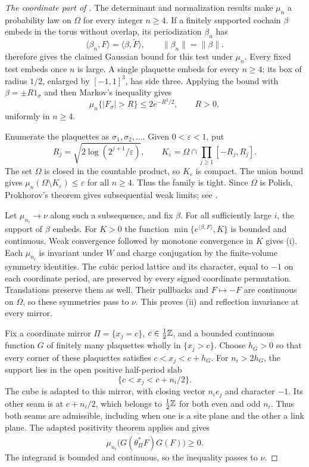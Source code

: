 \begin{proof}[The coordinate part of ]
The determinant and normalization results make $\mu_n$ a probability
law on $\Omega$ for every integer $n\ge4$. If a finitely supported
cochain $\beta$ embeds in the torus without overlap, its
periodization $\beta_n$ has
\[
 \langle\beta_n,F\rangle=\langle\beta,\widetilde F\rangle,
 \qquad \|\beta_n\|=\|\beta\|.
\]
 therefore gives the claimed Gaussian
bound for this test under $\mu_n$. Every fixed test embeds once
$n$ is large. A single plaquette embeds for every $n\ge4$: its
box of radius $1/2$, enlarged by $[-1,1]^3$, has side three.
Applying the bound with $\beta=\pm R1_\sigma$ and then Markov's
inequality gives
\[
 \mu_n\{|F_\sigma|>R\}\le2e^{-R^2/2},\qquad R>0,
\]
uniformly in $n\ge4$.

Enumerate the plaquettes as $\sigma_1,\sigma_2,\ldots$. Given
$0<\varepsilon<1$, put
\[
 R_j=\sqrt{2\log(2^{j+1}/\varepsilon)},\qquad
 K_\varepsilon=\Omega\cap\prod_{j\ge1}[-R_j,R_j].
\]
The set $\Omega$ is closed in the countable product, so
$K_\varepsilon$ is compact. The union bound gives
$\mu_n(\Omega\setminus K_\varepsilon)\le\varepsilon$ for all
$n\ge4$. Thus the family is tight. Since $\Omega$ is Polish,
Prokhorov's theorem gives subsequential weak limits; see
\cite[Theorem~1.1]{Sorensen}.

Let $\mu_{n_i}\to\nu$ along such a subsequence, and fix $\beta$.
For all sufficiently large $i$, the support of $\beta$ embeds.
For $K>0$ the function
$\min\{e^{\langle\beta,F\rangle},K\}$ is bounded and continuous.
Weak convergence followed by monotone convergence in $K$ gives
\textup{(i)}. Each $\mu_{n_i}$ is invariant under $W$ and charge
conjugation by the finite-volume symmetry identities. The cubic
period lattice and its character, equal to $-1$ on each coordinate
period, are preserved by every signed coordinate permutation.
Translations preserve them as well. Their pullbacks and $F\mapsto-F$
are continuous on $\Omega$, so these symmetries pass to $\nu$.
This proves \textup{(ii)} and reflection invariance at every mirror.

Fix a coordinate mirror $\Pi=\{x_j=c\}$, $c\in\tfrac12\mathbb Z$,
and a bounded continuous function $G$ of finitely many plaquettes
wholly in $\{x_j>c\}$. Choose $h_G>0$ so that every corner of
these plaquettes satisfies $c<x_j<c+h_G$. For $n_i>2h_G$, the
support lies in the open positive half-period slab
\[
 \{c<x_j<c+n_i/2\}.
\]
The cube is adapted to this mirror, with closing vector $n_ie_j$
and character $-1$. Its other seam is at $c+n_i/2$, which belongs
to $\tfrac12\mathbb Z$ for both even and odd $n_i$. Thus both seams are
admissible, including when one is a site plane and the other a
link plane. The adapted positivity theorem applies and gives
\[
 \mu_{n_i}\bigl(\overline{G(\theta_\Pi^*F)}G(F)\bigr)\ge0.
\]
The integrand is bounded and continuous, so the inequality passes
to $\nu$.


\end{proof}
